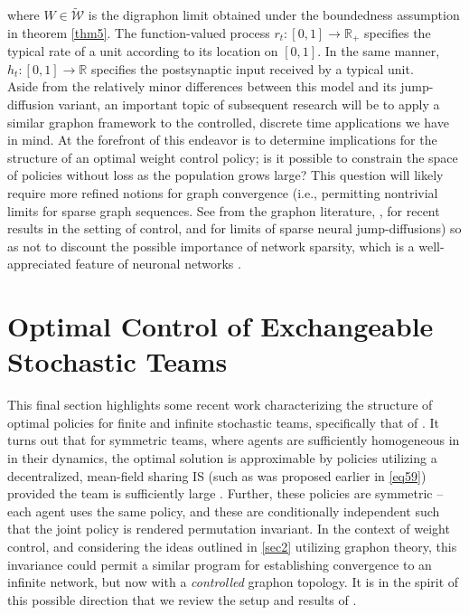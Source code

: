 \documentclass[12pt, oneside]{report}
\newcommand{\mbb}[1]{\mathbb{#1}}
\newcommand{\1}[1]{\mathbbm{1}_{\{#1\}}}
\newcommand{\mc}[1]{\mathcal{#1}}
\theoremstyle{definition}
\begin{document}
where $W\in\widetilde{\mc{W}}$ is the digraphon limit obtained under the
boundedness assumption in theorem \ref{thm5}. The function-valued process
$r_t:[0,1]\rightarrow\mbb{R}_+$ specifies the typical rate of a unit according
to its location on $[0,1]$. In the same manner, $h_t:[0,1]\rightarrow\mbb{R}$
specifies the postsynaptic input received by a typical unit.\\[5pt]
\indent Aside from the relatively minor differences between this model and its
jump-diffusion variant, an important topic of subsequent research will be to
apply a similar graphon framework to the controlled, discrete time applications
we have in mind. At the forefront of this endeavor is to determine implications for the structure of an optimal weight control policy; is it possible to constrain the space of policies without loss as the population
grows large? This question will likely require more refined notions for graph convergence
(i.e., permitting nontrivial limits for sparse graph sequences. See \cite{Borgs_Chayes_Cohn_Zhao_2018} from the graphon literature, \cite{Caines_Huang_2024},\cite{Fabian_Cui_Koeppl_2023} for
recent results in the setting of control, and \cite{Jabin_Zhou_2023} for limits of sparse neural jump-diffusions) so as not to
discount the possible importance of network sparsity, which is a well-appreciated feature of neuronal networks \cite{Betzel_Bassett_2017}. 
\section{Optimal Control of Exchangeable Stochastic Teams}\label{sec3}
This final section highlights some recent work characterizing the structure of
optimal policies for finite and infinite stochastic teams, specifically that of
\cite{Sanjari_Saldi_Yüksel_2024}. It turns out that for symmetric teams, where
agents are sufficiently homogeneous in in their dynamics, the optimal solution
is approximable by policies utilizing a decentralized, mean-field sharing IS
(such as was proposed earlier in \ref{eq59}) provided the team is sufficiently
large \cite[theorem 4]{Sanjari_Saldi_Yüksel_2024}. Further, these policies are
symmetric -- each agent uses the same policy, and these are conditionally
independent such that the joint policy is rendered permutation invariant. In the
context of weight control, and considering the ideas outlined in \ref{sec2}
utilizing graphon theory, this invariance could permit a similar program for
establishing convergence to an infinite network, but now with a
\textit{controlled} graphon topology. It is in the spirit of this possible
direction that we review the setup and results of
\cite{Sanjari_Saldi_Yüksel_2024}.
\end{document}
